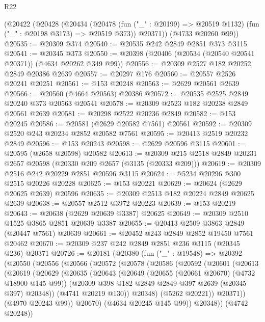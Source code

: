 \begin{lexlean}{R22}
\begin{coremodule}
    (@20422
      (@20428
        (@20434
          (@20478 (fun ("_" : @20199) => @20519 @1132) (fun ("_" : @20198 @3173) => @20519 @373))
          @20371))
      (@4733 @20260 @99))
@20535 := @20309 @374
@20540 := @20535 @242 @2849 @2851 @373 @3115
@20541 := @20345 @373
@20550 := @20398 (@20406 (@20534 (@20540 @20541 @20371)) (@4634 @20262 @349 @99))
@20556 := @20309 @2527 @182 @20252 @2849 @20386 @2639
@20557 := @20297 @176
@20560 := @20557 @2526 @20241 @20251
@20561 := @153 @20248
@20563 := @2629 @20561 @2639
@20566 := @20560 (@4664 @20563) @20386
@20572 := @20535 @2525 @2849 @20240 @373 @20563 @20541
@20578 := @20309 @2523 @182 @20238 @2849 @20561 @2639
@20581 := @20298 @2522 @20236 @2849
@20582 := @153 @20245
@20586 := @20581 (@2629 @20582 @7561) @20561
@20592 := @20309 @2520 @243 @20234 @2852 @20582 @7561
@20595 := @20413 @2519 @20232 @2849
@20596 := @153 @20243
@20598 := @2629 @20596 @3115
@20601 := @20595 (@2658 @20598) @20582
@20613 := @20309 @215 @2518 @2849 @20231 @2657 @20598 (@20330 @209 @2657 (@3135 (@20333 @209)))
@20619 := @20309 @2516 @242 @20229 @2851 @20596 @3115
@20624 := @5234 @20296 @300 @2515 @20226 @20228
@20625 := @153 @20221
@20629 := @20624 (@2629 @20625 @2639) @20596
@20635 := @20309 @2513 @182 @20224 @2849 @20625 @2639
@20638 := @20557 @2512 @3972 @20223
@20639 := @153 @20219
@20643 := @20638 (@2629 @20639 @3387) @20625
@20649 := @20309 @2510 @1525 @3865 @2851 @20639 @3387
@20655 := @20413 @2509 @3863 @2849 (@20447 @7561) @20639
@20661 := @20452 @243 @2849 @2852 @19450 @7561 @20462
@20670 := @20309 @237 @242 @2849 @2851 @236 @3115 (@20345 @236) @20371
@20726 := @20181
    (@20380
      (fun ("_" : @19548) =>
      @20392
        (@20550
          (@20556
            (@20566
              (@20572
                (@20578
                  (@20586
                    (@20592
                      (@20601
                        (@20613
                          (@20619
                            (@20629
                              (@20635
                                (@20643
                                  (@20649
                                    (@20655 (@20661 @20670) (@4732 @18900 @145 @99))
                                    (@20309 @398 @182 @2849 @2849 @397 @2639 (@20345 @397) @20348))
                                  (@4741 @20219 @130))
                                @20348)
                              (@5262 @20221))
                            @20371))
                        (@4970 @20243 @99))
                      @20670)
                    (@4634 @20245 @145 @99))
                  @20348))
              (@4742 @20248))

\end{coremodule}
\end{lexlean}
